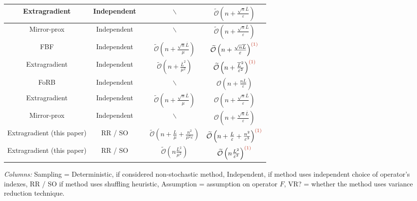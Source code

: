 \documentclass{article}
\newcommand{\green}{\color{mydarkgreen}}
\newcommand{\red}{\color{mydarkred}}
\newcommand{\cmark}{{\green\ding{51}}}
\newcommand{\xmark}{{\red\ding{55}}}
\begin{document}
\begin{table}
{\begin{threeparttable}
\begin{tabular}{|c|c|c|c|c|}
Extragradient \citep{carmon2019variance} & Independent & \cmark & $\backslash$  &  $\mathcal{\widetilde{O}}\left(n + \frac{\sqrt{n}\overline{L}}{\varepsilon}\right)$ \\ \hline
Mirror-prox \citep{carmon2019variance} & Independent & \cmark & $\backslash$ &  $\mathcal{\widetilde{O}}\left(n + \frac{\sqrt{n}\overline{L}}{\varepsilon}\right)$ \\ \hline
FBF \citep{palaniappan2016stochastic} & Independent & \cmark & $\mathcal{\widetilde{O}}\left(n + \frac{\sqrt{n}\overline{L}}{\mu}\right)$ &  $\mathcal{\widetilde{O}}\left(n + \frac{\sqrt{n}\overline{L}}{\varepsilon}\right)^{\red{(1)}}$ \\ \hline
Extragradient \citep{chavdarova2019reducing} & Independent & \cmark & $\mathcal{\widetilde{O}}\left(n + \frac{\overline{L}^2}{\mu^2}\right)$ &  $\mathcal{\widetilde{O}}\left(n + \frac{\overline{L}^2}{\varepsilon^2}\right)^{\red{(1)}}$ \\ \hline
FoRB \citep{alacaoglu2021forward} & Independent & \cmark & $\backslash$&  $\mathcal{O}\left(n + \frac{n\overline{L}}{\varepsilon}\right)$ \\ \hline
Extragradient \citep{alacaoglu2022stochastic} & Independent & \cmark & $\mathcal{\widetilde{O}}\left(n + \frac{\sqrt{n}\overline{L}}{\mu}\right)$ &  $\mathcal{O}\left(n + \frac{\sqrt{n}\overline{L}}{\varepsilon}\right)$ \\ \hline
Mirror-prox \citep{alacaoglu2022stochastic} & Independent & \cmark & $\backslash$ &  $\mathcal{O}\left(n + \frac{\sqrt{n}\overline{L}}{\varepsilon}\right)$ \\ \hline
\rowcolor{yellow} Extragradient (this paper) & RR / SO & \xmark & $\mathcal{\widetilde{O}}\left(n + \frac{L}{\mu} + \frac{n^2}{\mu^2\varepsilon}\right)$ & $\mathcal{\widetilde{O}}\left(n + \frac{L}{\varepsilon} + \frac{n^2}{\varepsilon^3}\right)^{\red{(1)}}$ \\ \hline
\rowcolor{yellow} Extragradient (this paper) & RR / SO & \cmark & $\mathcal{\widetilde{O}}\left(n\frac{L^2}{\mu^2}\right)$ &  $\mathcal{\widetilde{O}}\left(n\frac{L^2}{\varepsilon^2}\right)^{\red{(1)}}$  \\ \hline 
\end{tabular}%
\begin{tablenotes}
    \item [] {\em Columns:} Sampling = Deterministic, if considered non-stochastic method, Independent, if method uses independent choice of operator's indexes, RR / SO if method uses shuffling heuristic, Assumption = assumption on operator $F$, VR? = whether the method uses variance reduction technique.

\end{tablenotes}
\end{threeparttable}}
\end{table}
\end{document}
